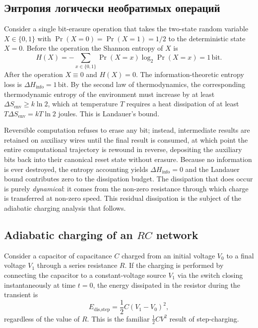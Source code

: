\subsection{Энтропия логически необратимых операций}
\label{subsec:entropy_irreversible}

Consider a single bit-erasure operation that takes the two-state random variable
$X \in \{0,1\}$ with $\Pr(X=0) = \Pr(X=1) = 1/2$ to the deterministic state $X=0$.
Before the operation the Shannon entropy of $X$ is
\[
  H(X) = -\sum_{x \in \{0,1\}} \Pr(X=x) \log_2 \Pr(X=x) = 1\,\text{bit}.
\]
After the operation $X \equiv 0$ and $H(X) = 0$.  The information-theoretic entropy
loss is $\Delta H_{\text{info}} = 1\,\text{bit}$.  By the second law of
thermodynamics, the corresponding thermodynamic entropy of the environment must
increase by at least $\Delta S_{\text{env}} \geq k \ln 2$, which at temperature $T$
requires a heat dissipation of at least $T \Delta S_{\text{env}} = kT \ln 2$ joules.
This is Landauer's bound.

Reversible computation refuses to erase any bit; instead, intermediate results are
retained on auxiliary wires until the final result is consumed, at which point the
entire computational trajectory is rewound in reverse, depositing the auxiliary bits
back into their canonical reset state without erasure.  Because no information is ever
destroyed, the entropy accounting yields $\Delta H_{\text{info}} = 0$ and the
Landauer bound contributes zero to the dissipation budget.  The dissipation that does
occur is purely \emph{dynamical}: it comes from the non-zero resistance through which
charge is transferred at non-zero speed.  This residual dissipation is the subject of
the adiabatic charging analysis that follows.

\subsection{Adiabatic charging of an $RC$ network}
\label{subsec:adiabatic_rc}

Consider a capacitor of capacitance $C$ charged from an initial voltage $V_0$ to a
final voltage $V_1$ through a series resistance $R$.  If the charging is performed by
connecting the capacitor to a constant-voltage source $V_1$ via the switch closing
instantaneously at time $t=0$, the energy dissipated in the resistor during the
transient is
\[
  E_{\text{dis,step}} = \frac{1}{2} C (V_1 - V_0)^2,
\]
regardless of the value of $R$.  This is the familiar $\frac{1}{2}CV^2$ result of
step-charging.

